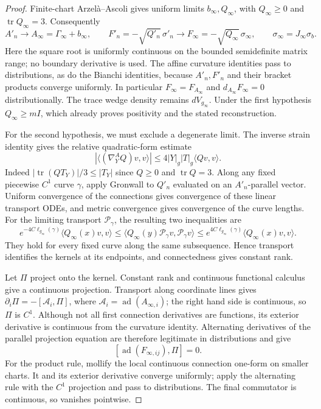 \documentclass[11pt]{article}
\numberwithin{equation}{section}
\theoremstyle{definition}
\theoremstyle{remark}
\DeclareMathOperator{\tr}{tr}
\begin{document}
\begin{proof}
Finite-chart Arzel\`a--Ascoli gives uniform limits
\(b_\infty,Q_\infty\), with \(Q_\infty\ge0\) and
\(\tr Q_\infty=3\). Consequently
\[
 A'_n\longrightarrow A_\infty=\Gamma_\infty+b_\infty,
 \qquad
 F'_n=-\sqrt{Q'_n}\,\sigma'_n
   \longrightarrow F_\infty=-\sqrt{Q_\infty}\,\sigma_\infty,
 \qquad \sigma_\infty=J_\infty\sigma_b .
\]
Here the square root is uniformly continuous on the bounded
semidefinite matrix range; no boundary derivative is used.
The affine curvature identities pass to distributions,
as do the Bianchi identities, because \(A'_n,F'_n\)
and their bracket products converge uniformly.
In particular \(F_\infty=F_{A_\infty}\) and
\(d_{A_\infty}F_\infty=0\) distributionally.
The trace wedge density remains \(dV_{g_\infty}\).
Under the first hypothesis \(Q_\infty\ge mI\), which
already proves positivity and the stated reconstruction.

For the second hypothesis, we must exclude a degenerate
limit. The inverse strain identity gives the relative
quadratic-form estimate
\[
 |\langle(\nabla^A_YQ)v,v\rangle|
       \le4|Y|_g|T|_g\langle Qv,v\rangle .
\]
Indeed \(|\tr(QT_Y)|/3\le|T_Y|\) since \(Q\ge0\)
and \(\tr Q=3\). Along any fixed piecewise \(C^1\)
curve \(\gamma\), apply Gronwall to \(Q'_n\) evaluated
on an \(A'_n\)-parallel vector. Uniform convergence of
the connections gives convergence of these linear
transport ODEs, and metric convergence gives convergence
of the curve lengths. For the limiting transport
\(\mathcal P_\gamma\), the resulting two inequalities are
\[
 e^{-4C\ell_{g_\infty}(\gamma)}
       \langle Q_\infty(x)v,v\rangle
 \le
 \langle Q_\infty(y)\mathcal P_\gamma v,\mathcal P_\gamma v\rangle
 \le
 e^{4C\ell_{g_\infty}(\gamma)}
       \langle Q_\infty(x)v,v\rangle .
\]
They hold for every fixed curve along the same subsequence.
Hence transport identifies the kernels at its endpoints,
and connectedness gives constant rank.

Let \(\Pi\) project onto the kernel. Constant rank and
continuous functional calculus give a continuous projection.
Transport along coordinate lines gives
\(\partial_i\Pi=-[\mathcal A_i,\Pi]\), where
\(\mathcal A_i=\operatorname{ad}(A_{\infty,i})\);
the right hand side is continuous, so \(\Pi\) is \(C^1\).
Although not all first connection derivatives are functions,
its exterior derivative is continuous from the curvature
identity. Alternating derivatives of the parallel projection
equation are therefore legitimate in distributions and give
\[
 [\operatorname{ad}(F_{\infty,ij}),\Pi]=0.
\]
For the product rule, mollify the local continuous connection
one-form on smaller charts. It and its exterior derivative
converge uniformly; apply the alternating rule with the
\(C^1\) projection and pass to distributions. The final
commutator is continuous, so vanishes pointwise.


\end{proof}
\end{document}
